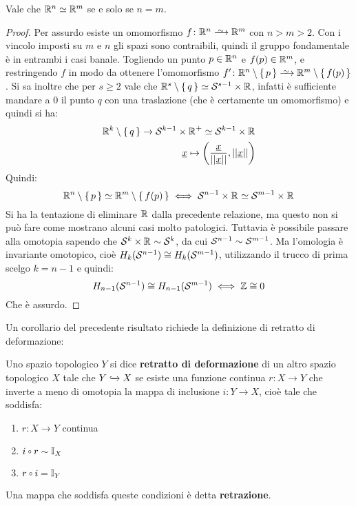 \begin{corollary}
  Vale che $ \mathbb{R}^{n} \simeq \mathbb{R}^{m} $ se e solo se $ n = m $.
\end{corollary}
\begin{proof}
  Per assurdo esiste un omomorfismo $ f \colon \RN{n} \homoto \RN{m} $ con $ n > m > 2 $.
  Con i vincolo imposti su $ m $ e $ n $ gli spazi sono contraibili, quindi il gruppo
  fondamentale è in entrambi i casi banale. Togliendo un punto $ p \in \mathbb{R}^{n} $ e
  $ f(p) \in \mathbb{R}^{m} $, e restringendo $ f $ in modo da ottenere l'omomorfismo
  $ f' \colon \RN{n} \setminus \set{p} \homoto \RN{m} \setminus \set{f(p)} $.
  Si sa inoltre che per $ s \geq 2 $ vale che $ \mathbb{R}^{s} \setminus \set{q} \simeq \mathcal{S}^{s-1} \times \mathbb{R}^{} $,
  infatti è sufficiente mandare a $ 0 $ il punto $ q $ con una traslazione
  (che è certamente un omomorfismo) e quindi si ha:
  \begin{align*}
    \mathbb{R}^{k} \setminus \set{q}  \to  \mathcal{S}^{k-1} \times {\mathbb{R}^{}}^+  \simeq \mathcal{S}^{k-1} \times \mathbb{R}^{} \\
    \underline{x} \mapsto \left(\frac{\underline{x}}{|| \underline{x} ||}, || \underline{x} || \right)
  \end{align*}
  Quindi:
  \[
    \mathbb{R}^{n} \setminus \set{p} \simeq \mathbb{R}^{m} \setminus \set{f(p)} \iff \mathcal{S}^{n-1} \times \mathbb{R}^{} \simeq \mathcal{S}^{m-1} \times \mathbb{R}^{}
  \]
  Si ha la tentazione di eliminare $ \mathbb{R}^{} $ dalla precedente relazione, ma
  questo non si può fare come mostrano alcuni casi molto patologici.
  Tuttavia è possibile passare alla omotopia sapendo che $ \mathcal{S}^{k} \times \mathbb{R}^{} \sim \mathcal{S}^{k} $,
  da cui $ \mathcal{S}^{n-1} \sim \mathcal{S}^{m-1} $. Ma l'omologia è invariante omotopico, cioè
  $ H_k(\mathcal{S}^{n-1}) \cong H_k(\mathcal{S}^{m-1}) $, utilizzando il trucco di prima scelgo $ k = n-1 $
  e quindi:
  \[
    H_{n-1}(\mathcal{S}^{n-1}) \cong H_{n-1}(\mathcal{S}^{m-1}) \iff \mathbb{Z} \cong 0
  \]
  Che è assurdo.
\end{proof}
\eproof
Un corollario del precedente risultato richiede la definizione di retratto di deformazione:
\begin{definition}
  Uno spazio topologico $ Y $ si dice \textbf{retratto di deformazione} di un altro
  spazio topologico $ X $ tale che $ Y \xhookrightarrow{} X $ se esiste una funzione continua $ r\colon X \to Y $ che inverte a meno di omotopia
  la mappa di inclusione $ i\colon Y \to X $, cioè tale che soddisfa:
  \begin{enumerate}
  \item $ r\colon X \to Y $ continua
  \item $ i \circ r \sim \Id{X} $
  \item $ r \circ i = \Id{Y} $
  \end{enumerate}
  Una mappa che soddisfa queste condizioni è detta \textbf{retrazione}.
\end{definition}
